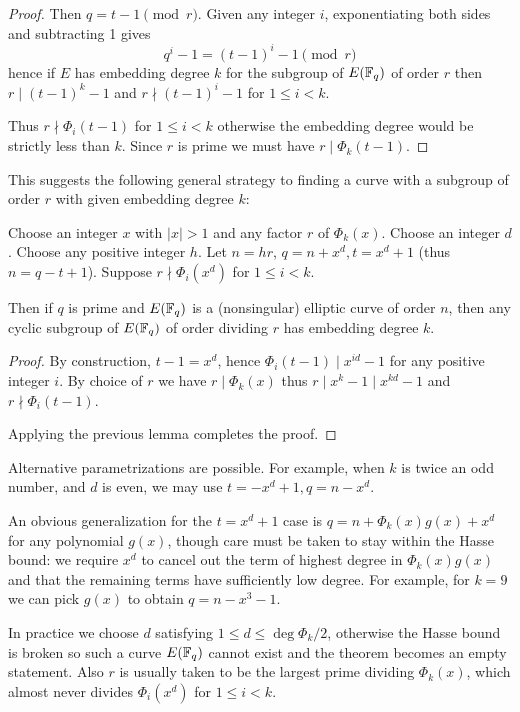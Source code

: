 \begin{proof}
Then $q = t - 1 \pmod r$. Given any integer $i$, exponentiating both sides
and subtracting 1 gives
\[ q^i - 1 = (t-1)^i -1 \pmod r \]
hence if $E$ has embedding degree $k$ for the subgroup of $E(\mathbb{F}_q)$ of order $r$
then $r \mid (t-1)^k - 1$ and $r \nmid (t-1)^i - 1$ for $1 \le i < k$.

Thus $r \nmid \Phi_i(t-1)$ for $1 \le i < k$ otherwise the embedding degree
would be strictly less than $k$. Since $r$ is prime we must have
$r \mid \Phi_k(t-1)$.
\end{proof}

This suggests the following general strategy to finding a curve with
a subgroup of order $r$ with given embedding degree $k$:

\begin{theorem}
Choose an integer $x$ with $|x| > 1$ and any factor $r$ of
$\Phi_k(x)$.
Choose an integer $d$.
Choose any positive integer $h$. Let $n = hr$, $q = n + x^d, t = x^d + 1$
(thus $n = q - t + 1$).
Suppose $r \nmid \Phi_i(x^d)$ for $1 \le i < k$.

Then if $q$ is prime and $E(\mathbb{F}_q)$ is a (nonsingular)
elliptic curve of order $n$, then
any cyclic subgroup of $E(\mathbb{F}_q)$ of order dividing
$r$ has embedding degree $k$.
\end{theorem}

\begin{proof}
By construction, $t-1 = x^d$, hence $\Phi_i(t-1) \mid x^{id} - 1$ for
any positive integer $i$.
By choice of $r$ we have
$r \mid \Phi_k(x)$ thus $r \mid x^k - 1 \mid x^{kd} - 1$ and
$r \nmid \Phi_i(t-1)$.

Applying the previous lemma completes the proof.
\end{proof}

Alternative parametrizations are possible. For example, when $k$ is twice
an odd number, and $d$ is even, we may use $t = -x^d + 1, q = n - x^d$.

An obvious generalization for the $t = x^d + 1$ case is
$q = n + \Phi_k(x)g(x) + x^d$ for any polynomial $g(x)$, though care must
be taken to stay within the Hasse bound: we require $x^d$ to cancel out the
term of highest degree in $\Phi_k(x)g(x)$ and that the remaining terms have
sufficiently low degree. For example, for $k=9$ we can pick $g(x)$ to obtain
$q = n - x^3 - 1$.

In practice we choose $d$ satisfying $1 \le d \le \deg \Phi_k /2$,
otherwise the Hasse bound is broken so such a curve $E(\mathbb{F}_q)$ cannot exist and
the theorem becomes an empty statement.
Also $r$ is usually taken to be the largest prime dividing $\Phi_k(x)$,
which almost never divides $\Phi_i(x^d)$ for $1 \le i < k$.

